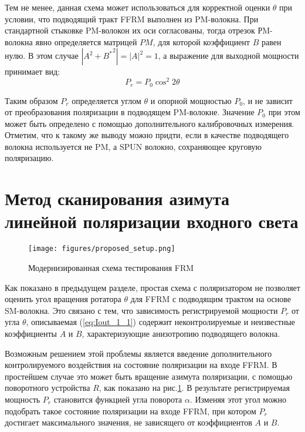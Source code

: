 \documentclass{article}
\begin{document}
Тем не менее, данная схема может использоваться для корректной оценки $\theta$ при условии, что подводящий тракт FFRM выполнен из PM-волокна.
При стандартной стыковке PM-волокон их оси согласованы, тогда отрезок РM-волокна явно определяется матрицей $PM$, для которой коэффициент $B$ равен нулю.
В этом случае $|A^2 + {B^*}^2| = |A|^2 = 1$, а выражение для выходной мощности принимает вид:
\begin{equation}
	\label{eq:Iout_1_2}
	P_{r} =  P_0 \cos^2 2 \theta 
\end{equation}

Таким образом $P_{r}$ определяется углом  $\theta$ и опорной мощностью $P_0$, и не зависит от преобразования поляризации в подводящем PM-волокне.
Значение $P_0$ при этом может быть определено с помощью дополнительного калибровочных измерения.
Отметим, что к такому же выводу можно придти, если в качестве подводящего волокна используется не PM, а SPUN волокно, сохраняющее круговую поляризацию.


\section{Метод сканирования азимута линейной поляризации входного света}
\begin{figure}[b]
	\centering
	\texttt{[image: figures/proposed\_setup.png]}
	\caption{Модернизированная схема тестирования FRM}
	\label{fig:proposed_setup}
\end{figure} 
Как показано в предыдущем разделе, простая схема с поляризатором не позволяет оценить угол вращения ротатора $\theta$ для FFRM с подводящим трактом на основе SM-волокна.
Это связано с тем, что зависимость регистрируемой мощности $P_r$ от угла $\theta$, описываемая (\ref{eq:Iout_1_1}) содержит неконтролируемые и неизвестные коэффициенты $A$ и $B$, характеризующие анизотропию подводящего волокна.

Возможным решением этой проблемы является введение дополнительного контролируемого воздействия на состояние поляризации на входе FFRM.
В простейшем случае это может быть вращение азимута поляризации, с помощью поворотного устройства $R$, как показано на рис.\ref{fig:proposed_setup}.
В результате регистрируемая мощность $P_r$ становится функцией угла поворота $\alpha$.
Изменяя этот угол можно подобрать такое состояние поляризации на входе FFRM, при котором $P_r$ достигает максимального значения, не зависящего от коэффициентов $A$ и $B$.
\end{document}

